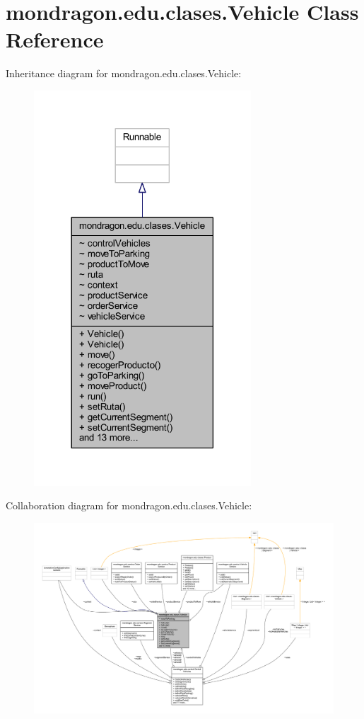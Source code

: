 \hypertarget{classmondragon_1_1edu_1_1clases_1_1_vehicle}{}\section{mondragon.\+edu.\+clases.\+Vehicle Class Reference}
\label{classmondragon_1_1edu_1_1clases_1_1_vehicle}


Inheritance diagram for mondragon.\+edu.\+clases.\+Vehicle\+:\nopagebreak
\begin{figure}[H]
\begin{center}
\leavevmode
\includegraphics[width=230pt]{classmondragon_1_1edu_1_1clases_1_1_vehicle__inherit__graph}
\end{center}
\end{figure}


Collaboration diagram for mondragon.\+edu.\+clases.\+Vehicle\+:
\nopagebreak
\begin{figure}[H]
\begin{center}
\leavevmode
\includegraphics[width=350pt]{classmondragon_1_1edu_1_1clases_1_1_vehicle__coll__graph}
\end{center}
\end{figure}
